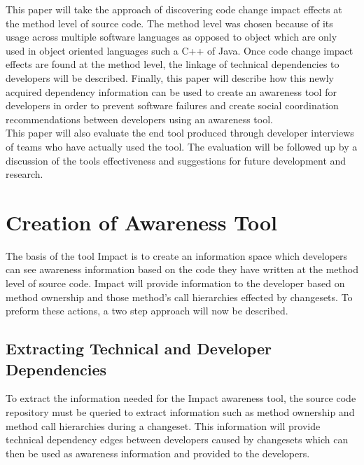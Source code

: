 \documentclass[conference]{IEEEtran}
\begin{document}
This paper will take the approach of discovering code change impact effects at the method
level of source code. The method level was chosen because of its usage across multiple
software languages as opposed to object which are only used in object oriented languages
such a C++ of Java. Once code change impact effects are found at the method level, the 
linkage of technical dependencies to developers will be described. Finally, this paper will
describe how this newly acquired dependency information can be used to create an awareness
tool for developers in order to prevent software failures and create social coordination
recommendations between developers using an awareness tool.\\

This paper will also evaluate the end tool produced through developer interviews of teams
who have actually used the tool.  The evaluation will be followed up by a discussion of
the tools effectiveness and suggestions for future development and research.\\


\section{Creation of Awareness Tool}

The basis of the tool Impact is to create an information space which developers can see awareness information
based on the code they have written at the method level of source code. Impact will provide information to the
developer based on method ownership and those method's call hierarchies effected by changesets.  To preform
these actions, a two step approach will now be described. \\

\subsection{Extracting Technical and Developer Dependencies}
To extract the information needed for the Impact awareness tool, the source code repository must be queried to
extract information such as method ownership and method call hierarchies during a changeset. This information
will provide technical dependency edges between developers caused by changesets which can then be used as
awareness information and provided to the developers. \\
\end{document}
